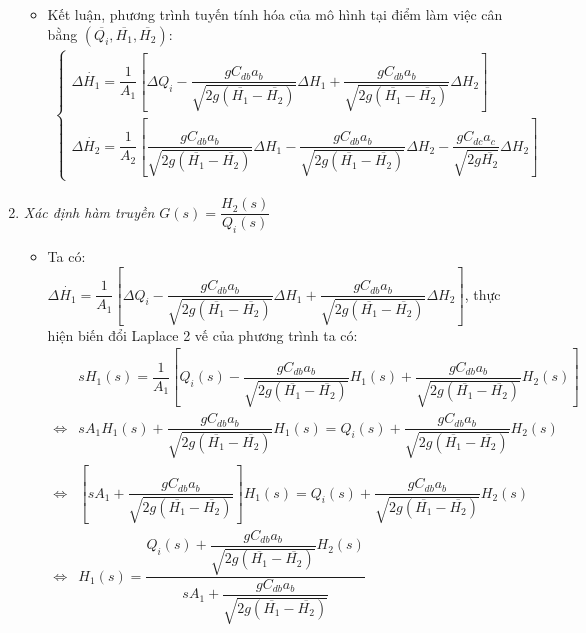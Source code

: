 \begin{enumerate}[\it a.]
\begin{itemize}
                \item Kết luận, phương trình tuyến tính hóa của mô hình tại điểm làm việc cân bằng $\left({\overline{Q_i}, \overline{H_1}, \overline{H_2}}\right)$:
                    \begin{align}
                        \left\{
                        \begin{array}{l}
                            \Delta \dot{H_1} = \dfrac{1}{A_1} \left[{\Delta Q_i - \dfrac{gC_{db}a_b}{\sqrt{2g(\overline{H_1} - \overline{H_2})}} \Delta H_1 + \dfrac{gC_{db}a_b}{\sqrt{2g(\overline{H_1} - \overline{H_2})}} \Delta H_2}\right]\\ [.5cm]
                            \Delta \dot{H_2} = \dfrac{1}{A_2} \left[{\dfrac{g C_{db}a_b}{\sqrt{2g(\overline{H_1} - \overline{H_2})}} \Delta H_1 - \dfrac{g C_{db}a_b}{\sqrt{2g(\overline{H_1} - \overline{H_2})}} \Delta H_2 - \dfrac{g C_{dc}a_c}{\sqrt{2g\overline{H_2}}} \Delta H_2}\right]
                        \end{array}
                        \right.
                    \end{align}
            \end{itemize}

        \item \textit{Xác định hàm truyền $G(s) = \dfrac{H_2(s)}{Q_i(s)}$}
            \begin{itemize}
                \item Ta có: $\Delta \dot{H_1} = \dfrac{1}{A_1} \left[{\Delta Q_i - \dfrac{gC_{db}a_b}{\sqrt{2g(\overline{H_1} - \overline{H_2})}} \Delta H_1 + \dfrac{gC_{db}a_b}{\sqrt{2g(\overline{H_1} - \overline{H_2})}} \Delta H_2}\right]$, thực hiện biến đổi Laplace 2 vế của phương trình ta có:
                    \begin{align}
                        & s H_1(s) = \dfrac{1}{A_1} \left[{Q_i(s) - \dfrac{gC_{db}a_b}{\sqrt{2g(\overline{H_1} - \overline{H_2})}} H_1(s) + \dfrac{gC_{db}a_b}{\sqrt{2g(\overline{H_1} - \overline{H_2})}} H_2(s)}\right]\\
                        \Longleftrightarrow & s A_1 H_1(s) + \dfrac{gC_{db}a_b}{\sqrt{2g(\overline{H_1} - \overline{H_2})}} H_1(s) = Q_i(s) + \dfrac{gC_{db}a_b}{\sqrt{2g(\overline{H_1} - \overline{H_2})}} H_2(s)\\
                        \Longleftrightarrow & \left[{s A_1 + \dfrac{gC_{db}a_b}{\sqrt{2g(\overline{H_1} - \overline{H_2})}}}\right] H_1(s) = Q_i(s) + \dfrac{gC_{db}a_b}{\sqrt{2g(\overline{H_1} - \overline{H_2})}} H_2(s) \\
                        \Longleftrightarrow & H_1(s) = \dfrac{Q_i(s) + \dfrac{gC_{db}a_b}{\sqrt{2g(\overline{H_1} - \overline{H_2})}} H_2(s)}{s A_1 + \dfrac{gC_{db}a_b}{\sqrt{2g(\overline{H_1} - \overline{H_2})}}}
                    \end{align}


\end{itemize}
\end{enumerate}
